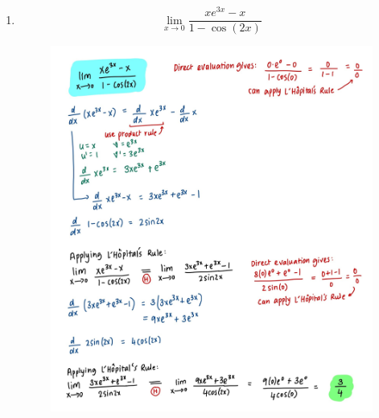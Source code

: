\documentclass{article}
\begin{document}
\begin{enumerate}
\begin{figure}[H]
        \label{fig:Q9}
    \end{figure}
    \newpage
    \item $$\lim_{x \rightarrow 0}\frac{xe^{3x}-x}{1-\cos(2x)}$$
    \begin{figure}[H]
        \centering
        \includegraphics[width=\linewidth]{Q10.jpg}
        \label{fig:Q10}
    \end{figure}
\end{enumerate}
\end{document}
